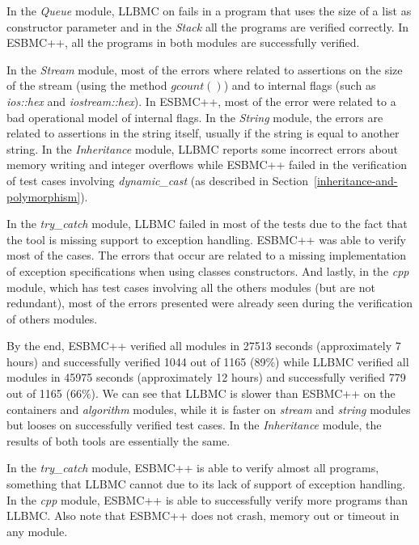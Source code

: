 \documentclass[a4paper]{llncs}
\begin{document}
In the \textit{Queue} module, LLBMC on fails in a program that uses the size of a list
as constructor parameter and in the \textit{Stack} all the programs are verified correctly.
In ESBMC++, all the programs in both modules are successfully verified.

In the \textit{Stream} module, most of the errors where related to assertions on the size
of the stream (using the method $gcount\left(\right)$) and to internal flags (such as
\textit{ios::hex} and \textit{iostream::hex}). In ESBMC++, most of the error were related
to a bad operational model of internal flags. In the \textit{String} module, the errors are related
to assertions in the string itself, usually if the string is equal to another string.
In the \textit{Inheritance} module, LLBMC reports some incorrect errors about memory writing and
integer overflows while ESBMC++ failed in the verification of test cases involving
\textit{dynamic\_cast} (as described in Section~\ref{inheritance-and-polymorphism}).

In the \textit{try\_catch} module, LLBMC failed in most of the tests due to the fact that
the tool is missing support to exception handling. ESBMC++ was able to verify most of the cases.
The errors that occur are related to a missing implementation of exception specifications when
using classes constructors. And lastly, in the \textit{cpp} module, which has test cases involving all
the others modules (but are not redundant), most of the errors presented were already seen during
the verification of others modules.

By the end, ESBMC++ verified all modules in 27513 seconds (approximately 7 hours)
and successfully verified 1044 out of 1165 (89\%) while LLBMC verified all modules
in 45975 seconds (approximately 12 hours) and successfully verified 779 out of 1165
(66\%). We can see that LLBMC is slower than ESBMC++ on the containers
and \textit{algorithm} modules, while it is faster on \textit{stream} and
\textit{string} modules but looses on successfully verified test cases.
In the \textit{Inheritance} module, the results of both tools are essentially the same.

In the \textit{try\_catch} module, ESBMC++ is able to verify almost all programs,
something that LLBMC cannot due to its lack of support of exception handling.
In the \textit{cpp} module, ESBMC++ is able to successfully verify more programs than LLBMC.
Also note that ESBMC++ does not crash, memory out or timeout in any module.

\end{document}
